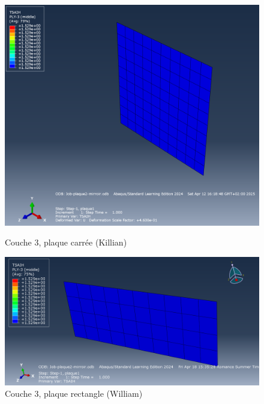 \documentclass[a4paper,12pt]{article}
\begin{document}
\begin{figure}[H]
	\centering
	\begin{minipage}{0.495\textwidth}
		\centering
		\includegraphics[width=\textwidth]{media/K_P2_L3-6_12042025.png} %
		\caption{Couche 3, plaque carrée (Killian)}
		\label{fig:image1}
	\end{minipage}
	\hfill
	\begin{minipage}{0.495\textwidth}
		\centering
		\includegraphics[width=\textwidth]{media/Couche3_mirroir.png} %
		\caption{Couche 3, plaque rectangle (William)}
		\label{fig:image2}
	\end{minipage}
\end{figure}
\end{document}

